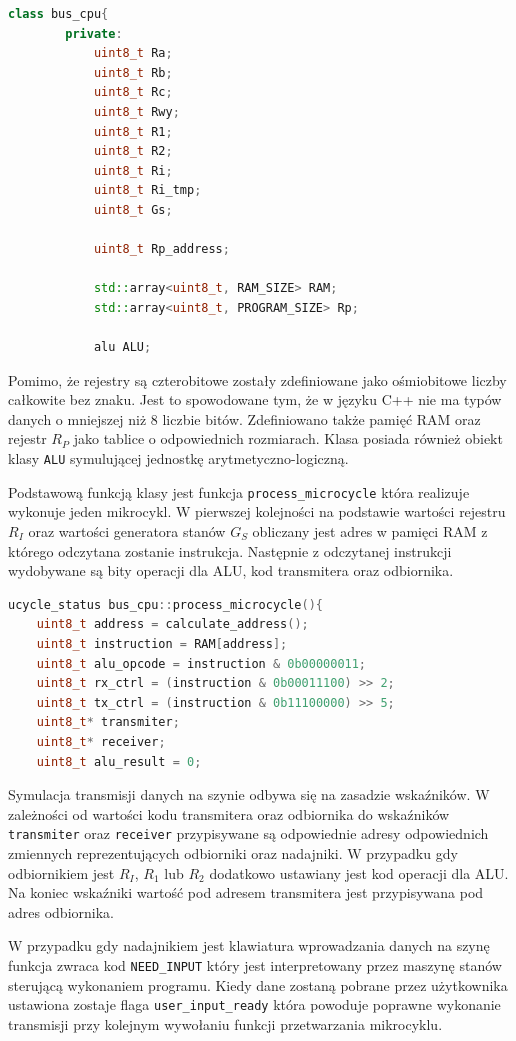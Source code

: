 \documentclass[../main.tex]{subfiles}
\begin{document}
\begin{lstlisting}[language=C++]
    class bus_cpu{
        private:
            uint8_t Ra;
            uint8_t Rb;
            uint8_t Rc;
            uint8_t Rwy;
            uint8_t R1;
            uint8_t R2;
            uint8_t Ri;
            uint8_t Ri_tmp;
            uint8_t Gs;
        
            uint8_t Rp_address;
        
            std::array<uint8_t, RAM_SIZE> RAM;
            std::array<uint8_t, PROGRAM_SIZE> Rp;
        
            alu ALU;
\end{lstlisting}

Pomimo, że rejestry są czterobitowe zostały zdefiniowane jako ośmiobitowe liczby całkowite bez znaku. Jest to spowodowane tym, że w języku C++ nie 
ma typów danych o mniejszej niż 8 liczbie bitów. Zdefiniowano także pamięć RAM oraz rejestr $R_P$ jako tablice o odpowiednich rozmiarach. 
Klasa posiada również obiekt klasy \texttt{ALU} symulującej jednostkę arytmetyczno-logiczną.
\par
Podstawową funkcją klasy jest funkcja \texttt{process\_microcycle} która realizuje wykonuje jeden mikrocykl. 
W pierwszej kolejności na podstawie wartości rejestru $R_I$ oraz wartości generatora stanów $G_S$ obliczany jest adres w pamięci RAM z którego 
odczytana zostanie instrukcja. Następnie z odczytanej instrukcji wydobywane są bity operacji dla ALU, kod transmitera oraz odbiornika. 

\begin{lstlisting}[language=C++]
    ucycle_status bus_cpu::process_microcycle(){
    uint8_t address = calculate_address();
    uint8_t instruction = RAM[address]; 
    uint8_t alu_opcode = instruction & 0b00000011;
    uint8_t rx_ctrl = (instruction & 0b00011100) >> 2;
    uint8_t tx_ctrl = (instruction & 0b11100000) >> 5;
    uint8_t* transmiter;
    uint8_t* receiver;
    uint8_t alu_result = 0;
\end{lstlisting}
\par
Symulacja transmisji danych na szynie odbywa się na zasadzie wskaźników. W zależności od wartości kodu transmitera oraz odbiornika do
wskaźników \texttt{transmiter} oraz \texttt{receiver} przypisywane są odpowiednie adresy odpowiednich zmiennych reprezentujących odbiorniki oraz nadajniki.
W przypadku gdy odbiornikiem jest $R_I$, $R_1$ lub $R_2$ dodatkowo ustawiany jest kod operacji dla ALU. 
Na koniec wskaźniki wartość pod adresem transmitera jest przypisywana pod adres odbiornika.
\par
W przypadku gdy nadajnikiem jest klawiatura wprowadzania danych na szynę funkcja zwraca kod \texttt{NEED\_INPUT} który jest interpretowany
przez maszynę stanów sterującą wykonaniem programu. Kiedy dane zostaną pobrane przez użytkownika ustawiona zostaje flaga \texttt{user\_input\_ready}
która powoduje poprawne wykonanie transmisji przy kolejnym wywołaniu funkcji przetwarzania mikrocyklu.
\end{document}
